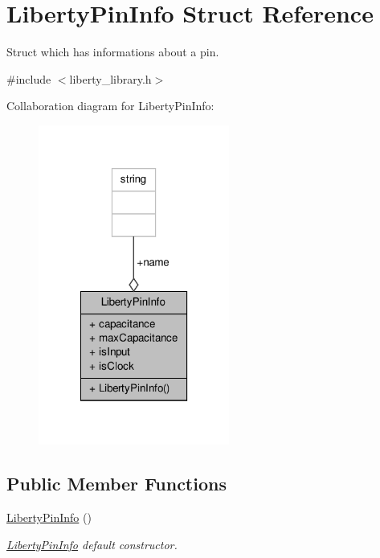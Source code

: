 \hypertarget{structLibertyPinInfo}{\section{Liberty\-Pin\-Info Struct Reference}
\label{structLibertyPinInfo}
}


Struct which has informations about a pin.  




{\ttfamily \#include $<$liberty\-\_\-library.\-h$>$}



Collaboration diagram for Liberty\-Pin\-Info\-:\nopagebreak
\begin{figure}[H]
\begin{center}
\leavevmode
\includegraphics[width=178pt]{structLibertyPinInfo__coll__graph}
\end{center}
\end{figure}
\subsection*{Public Member Functions}
\begin{DoxyCompactItemize}
\item 
\hyperlink{structLibertyPinInfo_a268a64137463b6b6fdc87ed036184e45}{Liberty\-Pin\-Info} ()
\begin{DoxyCompactList}\small\item\em \hyperlink{structLibertyPinInfo}{Liberty\-Pin\-Info} default constructor. \end{DoxyCompactList}\end{DoxyCompactItemize}
